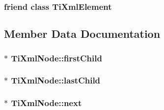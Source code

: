\subsubsection[{\texorpdfstring{Ti\+Xml\+Element}{TiXmlElement}}]{\setlength{\rightskip}{0pt plus 5cm}friend class {\bf Ti\+Xml\+Element}\hspace{0.3cm}{\ttfamily [friend]}}\hypertarget{class_ti_xml_node_ab6592e32cb9132be517cc12a70564c4b}{}\label{class_ti_xml_node_ab6592e32cb9132be517cc12a70564c4b}


\subsection{Member Data Documentation}
\subsubsection[{\texorpdfstring{first\+Child}{firstChild}}]{$\ast$ Ti\+Xml\+Node\+::first\+Child\hspace{0.3cm}{\ttfamily [protected]}}\hypertarget{class_ti_xml_node_af749fb7f22010b80e8f904c32653d50e}{}\label{class_ti_xml_node_af749fb7f22010b80e8f904c32653d50e}
\subsubsection[{\texorpdfstring{last\+Child}{lastChild}}]{$\ast$ Ti\+Xml\+Node\+::last\+Child\hspace{0.3cm}{\ttfamily [protected]}}\hypertarget{class_ti_xml_node_a5b30756d21b304580d22a841ec9d61f8}{}\label{class_ti_xml_node_a5b30756d21b304580d22a841ec9d61f8}
\subsubsection[{\texorpdfstring{next}{next}}]{$\ast$ Ti\+Xml\+Node\+::next\hspace{0.3cm}{\ttfamily [protected]}}\hypertarget{class_ti_xml_node_a2f329cc993d2d34df76e17dcbb776b45}{}\label{class_ti_xml_node_a2f329cc993d2d34df76e17dcbb776b45}
